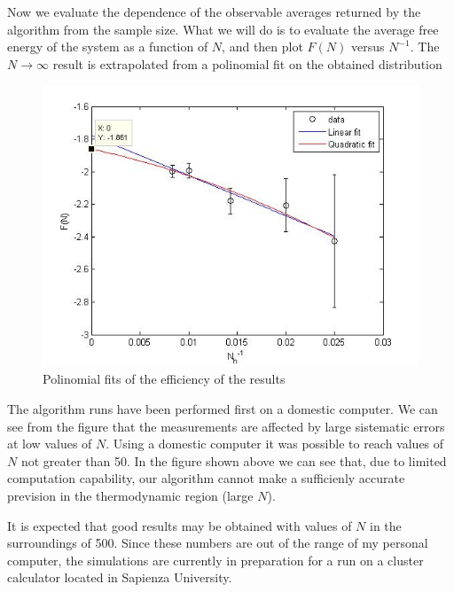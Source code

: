 Now we evaluate the dependence of the observable averages returned by the algorithm from the sample size.
What we will do is to evaluate the average free energy of the system as a function of $N$, and then plot $F(N)$ versus $N^{-1}$. The $N\rightarrow\infty$ result is extrapolated from a polinomial fit on the obtained distribution
\begin{figure}
	\centering
		\includegraphics[scale = 0.6]{img/polyN.jpg}
		\caption{Polinomial fits of the efficiency of the results}
\end{figure}

The algorithm runs have been performed first on a domestic computer. We can see from the figure that the measurements are affected by large sistematic errors at low values of $N$. Using a domestic computer it was possible to reach values of $N$ not greater than 50.
In the figure shown above we can see that, due to limited computation capability, our algorithm cannot make a sufficienly accurate prevision in the thermodynamic region (large $N$).

It is expected that good results may be obtained with values of $N$ in the surroundings of 500. Since these numbers are out of the range of my personal computer, the simulations are currently in preparation for a run on a cluster calculator located in Sapienza University.




